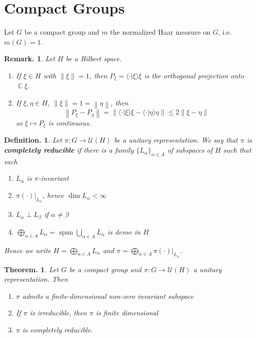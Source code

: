 \documentclass[11pt, a4paper]{memoir}
\DeclareMathOperator{\C}{{\mathbb{C}}}
\newcommand{\norm}[1]{\ensuremath{\left\lVert#1\right\rVert}}
\theoremstyle{change}
\newtheorem{theorem}{Theorem.}[section]
\theoremstyle{plain}
\theoremstyle{nonumberplain}
\newtheorem{definition}{Definition.}
\newtheorem{remark}{Remark.}
\DeclareMathOperator{\spn}{span}
\newcommand{\defn}[1]{{\boldmath\bfseries #1}}
\numberwithin{equation}{section}
\begin{document}
\section{Compact Groups}
Let $G$ be a compact group and $m$ the normalized Haar measure on $G$, i.e. $m(G)=1$.
\begin{remark}
    Let $H$ be a Hilbert space.
    \begin{enumerate}[nl,r]
        \item If $\xi\in H$ with $\norm{\xi}=1$, then $P_\xi=\langle\cdot|\xi\rangle\xi$ is the orthogonal projection onto $\C\xi$.
        \item If $\xi,\eta\in H$, $\norm{\xi}=1=\norm{\eta}$, then
            \begin{equation*}
                \norm{P_\xi-P_\eta}=\norm{\langle\cdot|\xi\rangle\xi-\langle\cdot|\eta\rangle\eta}\leq 2\norm{\xi-\eta}
            \end{equation*}
            so $\xi\mapsto P_\xi$ is continuous.
    \end{enumerate}
\end{remark}
\begin{definition}
    Let $\pi:G\to\mathcal{U}(H)$ be a unitary representation.
    We say that $\pi$ is \defn{completely reducible} if there is a family $\{L_\alpha\}_{\alpha\in A}$ of subspaces of $H$ such that each
    \begin{enumerate}[nl,a]
        \item $L_\alpha$ is $\pi$-invariant
        \item $\pi(\cdot)|_{L_\alpha}$, hence $\dim L_\alpha<\infty$
        \item $L_\alpha\perp L_\beta$ if $\alpha\neq\beta$
        \item $\bigoplus_{\alpha\in A}L_\alpha=\spn\bigcup_{\alpha\in A}L_\alpha$ is dense in $H$
    \end{enumerate}
    Hence we write $H=\bigoplus_{\alpha\in A}L_\alpha$ and $\pi=\bigoplus_{\alpha\in A}\pi(\cdot)|_{L_{\alpha}}$.
\end{definition}
\begin{theorem}
    Let $G$ be a compact group and $\pi:G\to\mathcal{U}(H)$ a unitary representation.
    Then
    \begin{enumerate}[nl,r]
        \item $\pi$ admits a finite-dimensional non-zero invariant subspace
        \item If $\pi$ is irreducible, then $\pi$ is finite dimensional
        \item $\pi$ is completely reducible.
    \end{enumerate}
\end{theorem}
\end{document}
